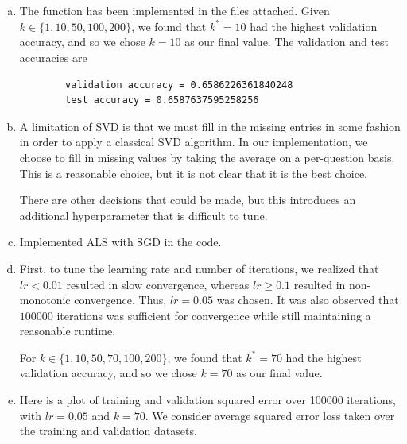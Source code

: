 \documentclass{article}
\begin{document}
\section{}

\begin{enumerate}[(a)]
    \item The function has been implemented in the files attached. Given $k \in \{1, 10, 50, 100, 200\}$, we found that $k^* = 10$ had the highest validation accuracy, and so we chose $k = 10$ as our final value. The validation and test accuracies are 
    
    \begin{verbatim}
        validation accuracy = 0.6586226361840248
        test accuracy = 0.6587637595258256
    \end{verbatim}

    \item A limitation of SVD is that we must fill in the missing entries in some fashion in order to apply a classical SVD algorithm. In our implementation, we choose to fill in missing values by taking the average on a per-question basis. This is a reasonable choice, but it is not clear that it is the best choice.
    
    There are other decisions that could be made, but this introduces an additional hyperparameter that is difficult to tune. 

    \item Implemented ALS with SGD in the code. 
    
    \item First, to tune the learning rate and number of iterations, we realized that $lr < 0.01$ resulted in slow convergence, whereas $lr \geq 0.1$ resulted in non-monotonic convergence. Thus, $lr = 0.05$ was chosen. It was also observed that $100000$ iterations was sufficient for convergence while still maintaining a reasonable runtime.
    
    For $k \in \{1, 10, 50, 70, 100, 200\}$, we found that $k^* = 70$ had the highest validation accuracy, and so we chose $k = 70$ as our final value. 
    \item Here is a plot of training and validation squared error over 100000 iterations, with $lr = 0.05$ and $k = 70$. We consider average squared error loss taken over the training and validation datasets. 
    

\end{enumerate}
\end{document}
